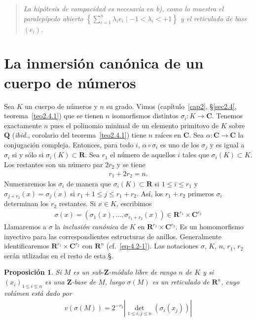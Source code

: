 \documentclass[bibtotoc,leqno,spanish]{amsbook}
\newcommand{\RR}{\mathbf{R}}
\newcommand{\QQ}{\mathbf{Q}}
\newcommand{\ZZ}{\mathbf{Z}}
\newcommand{\CC}{\mathbf{C}}
\newcommand{\oline}[1]{\overline{#1}}
\newcommand{\abs}[1]{\left\lvert#1\right\rvert}
\renewcommand{\to}[1][]{\xrightarrow{#1}}
\numberwithin{equation}{section}
\newenvironment{comm}%
	{\begin{quotation}\itshape}
	{\end{quotation}}
\theoremstyle{note}
\theoremstyle{note}
\newtheorem{proposition}{Proposici\'on}
\theoremstyle{rem}
\numberwithin{theorem}{section}
\numberwithin{proposition}{section}
\numberwithin{definition}{section}
\numberwithin{lemma}{section}
\numberwithin{corollary}{section}
\numberwithin{example}{section}
\numberwithin{footnote}{section}%
\begin{document}
\begin{comm}
La hip\'otesis de compacidad es necesaria en b), como lo muestra el paralep\'ipedo abierto
$\left\{\sum_{i=1}^{n}\lambda_{i}e_{i}\mid-1<\lambda_{i}<+1\right\}$ y el reticulado de base $(e_{i})$.
\end{comm}

\section{La inmersi\'on can\'onica de un cuerpo de n\'umeros}\label{sec4.2}

Sea $K$ un cuerpo de n\'umeros y $n$ su grado. Vimos
(cap\'itulo~\ref{cap2}, \S\ref{sec2.4}, teorema~\ref{teo2.4.1}) que se tienen $n$
isomorfismos distintos $\sigma_{i}:K\to\CC$. Tenemos exactamente $n$ pues el polinomio minimal de
un elemento primitovo de $K$ sobre $\QQ$ ({\em ibid.}, corolario del teorema~\ref{teo2.4.1}) tiene $n$ ra\'ices en $\CC$. Sea
$\alpha:\CC\to\CC$ la conjugaci\'on compleja. Entonces, para todo $i$, $\alpha\circ\sigma_{i}$ es uno
de los $\sigma_{j}$ y es igual a $\sigma_{i}$ si y s\'olo si $\sigma_{i}(K)\subset\RR$. Sea $r_{1}$ el n\'umero
de aquellos $i$ tales que $\sigma_{i}(K)\subset K$. Los restantes son un n\'umero par $2r_{2}$ y
se tiene
\begin{gather}\label{eq-4.2-1}
r_{1}+2r_{2}=n.
\end{gather}
Numeraremos los $\sigma_{i}$ de manera que $\sigma_{i}(K)\subset\RR$ si $1\leq i\leq r_{1}$ y
$\sigma_{j+r_{2}}(x) = \oline{\sigma_{j}(x)}$ si $r_{1}+1\leq j\leq r_{1}+r_{2}$. As\'i, los $r_{1}+r_{2}$
primeros $\sigma_{i}$ determinan los $r_{2}$ restantes. Si $x\in K$, escribimos
\begin{gather}
\sigma(x) = (\sigma_{1}(x),\dots,\sigma_{r_{1}+r_{2}}(x))\in\RR^{r_{1}}\times\CC^{r_{2}}
\end{gather}
Llamaremos a $\sigma$ la {\em inclusi\'on can\'onica} de $K$ en $\RR^{r_{1}}\times\CC^{r_{2}}$. Es un
homomorfismo inyectivo para las correspondientes estructuras de anillos. Generalmente identificaremos
$\RR^{r_{1}}\times\CC^{r_{2}}$ con $\RR^{n}$ (cf.~\eqref{eq-4.2-1}). Las notaciones $\sigma$, $K$, $n$, $r_{1}$, $r_{2}$
ser\'an utlizadas en el resto de esta \S.

\begin{proposition}\label{prop4.2.1}
Si $M$ es un sub-$\ZZ$-m\'odulo libre de rango $n$ de $K$ y si $(x_{i})_{1\leq i\leq n}$ es una $\ZZ$-base
de $M$, luego $\sigma(M)$ es un reticulado de $\RR^{n}$, cuyo vol\'umen est\'a dado por
\begin{gather}\label{eq-4.2-3}
v(\sigma(M)) = 2^{-r_{2}}\abs{\det_{1\leq i,j\leq n}(\sigma_{i}(x_{j}))}
\end{gather}
\end{proposition}
\end{document}
